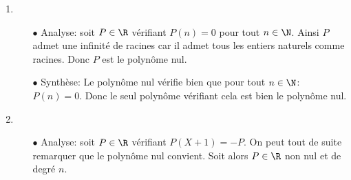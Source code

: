 \documentclass[a4paper, 11pt,reqno]{article}
\begin{document}
\begin{correction}
\begin{enumerate}
\begin{itemize}
			            \begin{itemize}
				            \item[$\star$] On peut commencer par regarder si l'\'equation v\'erifi\'ee par $P$ impose des conditions sur le degr\'e de $P$. D'un c\^{o}t\'e, on a: $\deg{6P}=n$ et de l'autre c\^{o}t\'e, on a par propri\'et\'e sur le degr\'e d'une d\'eriv\'ee et d'un produit de polyn\^{o}mes: $\deg{(2X^2-3)P^{\prime\prime}}=2+(n-2)=n$. Donc l'\'equation n'impose aucune condition sur le degr\'e de $P$.
				            \item[$\star$] On peut ensuite regarder ce que cette \'equation impose au niveau du coefficient de plus haut degr\'e. On a: $P=a_nX^n+T$ avec $T\in\R_{n-1}\lbrack X\rbrack$. Ainsi $P^{\prime\prime}=n(n-1)a_n X^{n-2}+T^{\prime\prime}$ avec $T^{\prime\prime}\in \R_{n-3}\lbrack X\rbrack $. Ainsi, on a: $(2X^2-3)(n(n-1)a_n X^{n-2}+T^{\prime\prime})=a_nX^n+T$. Et par unicict\'e des coefficients d'un polyn\^{o}me, on obtient que: $2n(n-1)a_n=6a_n\Leftrightarrow (n^2-n-3)a_n=0$. Comme $a_n\not= 0$, on doit avoir: $n^2-n-3=0$. Le discriminant vaut 13 et les racines ne sont donc pas enti\`{e}res. Ainsi, il n'existe aucun $n\in\N$ tel que: $2n(n-1)a_n=6a_n$.
			            \end{itemize}
			            Ainsi il n'existe aucun polyn\^{o}me non nul v\'erifiant $(2X^2-3)P^{\prime\prime}-6P=0$.
			      \item[$\bullet$] Synth\`{e}se: Seul le polyn\^{o}me nul v\'erifie $(2X^2-3)P^{\prime\prime}-6P=0$.
		      \end{itemize}
		\item
		      \begin{itemize}
			      \item[$\bullet$] Analyse: soit $P\in\R$ v\'erifiant $P(n)=0$ pour tout $n\in\N$. Ainsi $P$ admet une infinit\'e de racines car il admet tous les entiers naturels comme racines. Donc $P$ est le polyn\^{o}me nul.
			      \item[$\bullet$] Synth\`{e}se: Le polyn\^{o}me nul v\'erifie bien que pour tout $n\in\N$: $P(n)=0$. Donc le seul polyn\^{o}me v\'erifiant cela est bien le polyn\^{o}me nul.
		      \end{itemize}
		\item
		      \begin{itemize}
			      \item[$\bullet$] Analyse: soit $P\in\R$ v\'erifiant $P(X+1)=-P$. On peut tout de suite remarquer que le polyn\^{o}me nul convient. Soit alors $P\in\R$ non nul et de degr\'e $n$.

\end{itemize}
\end{enumerate}
\end{correction}
\end{document}
